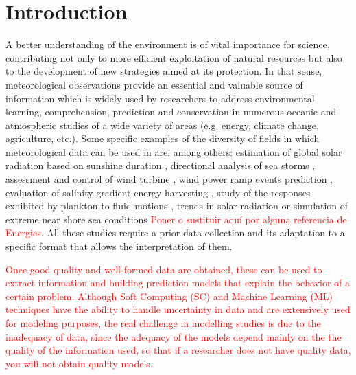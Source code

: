 \documentclass[energies,article,submit,moreauthors,pdftex]{Definitions/mdpi}
\begin{document}


	\section{Introduction}
		
		A better understanding of the environment is of vital importance for science, contributing not only to more efficient exploitation of natural resources but also to the development of new strategies aimed at its protection. In that sense, meteorological observations provide an essential and valuable source of information which is widely used by researchers to address environmental learning, comprehension, prediction and conservation in numerous oceanic and atmospheric studies of a wide variety of areas (e.g. energy, climate change, agriculture, etc.). Some specific examples of the diversity of fields in which meteorological data can be used in are, among others: estimation of global solar radiation based on sunshine duration \cite{SHAHRUKHANIS2019179}, directional analysis of sea storms \cite{LAFACE201545}, assessment and control of wind turbine \cite{DAHHANI2018167}, wind power ramp events prediction \cite{DORADOMORENO2017428}, evaluation of salinity-gradient energy harvesting \cite{REYESMENDOZA2020100645}, study of the responses exhibited by plankton to fluid motions \cite{FUCHS2016109}, trends in solar radiation \cite{SILVA20101852} or simulation of extreme near shore sea conditions \cite{GOULDBY201415} \textcolor{red}{Poner o sustituir aquí por alguna referencia de Energies}. All these studies require a prior data collection and its adaptation to a specific format that allows the interpretation of them.
		
		\textcolor{red}{Once good quality and well-formed data are obtained, these can be used to extract information and building prediction models that explain the behavior of a certain problem. Although Soft Computing (SC) and Machine Learning (ML) techniques have the ability to handle uncertainty in data and are extensively used for modeling purposes, the real challenge in modelling studies is due to the inadequacy of data, since the adequacy of the models depend mainly on the the quality of the information used, so that if a researcher does not have quality data, you will not obtain quality models.}
		
\end{document}
